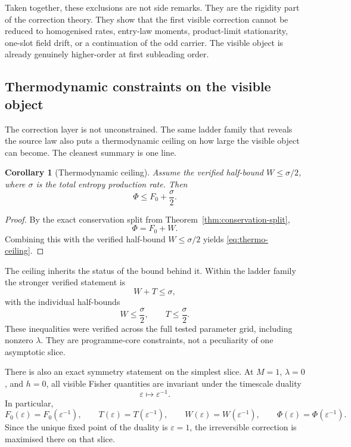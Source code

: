 \documentclass[11pt]{article}
\numberwithin{equation}{section}
\newcommand{\eps}{\varepsilon}
\theoremstyle{thmcompact}
\newtheorem{corollary}[theorem]{Corollary}
\theoremstyle{remark}
\begin{document}
Taken together, these exclusions are not side remarks. They are the rigidity part of the correction theory. They show that the first visible correction cannot be reduced to homogenised rates, entry-law moments, product-limit stationarity, one-slot field drift, or a continuation of the odd carrier. The visible object is already genuinely higher-order at first subleading order.

\subsection{Thermodynamic constraints on the visible object}

The correction layer is not unconstrained. The same ladder family that reveals the source law also puts a thermodynamic ceiling on how large the visible object can become. The cleanest summary is one line.

\begin{corollary}[Thermodynamic ceiling]\label{cor:thermodynamic-ceiling}
Assume the verified half-bound $W\le \sigma/2$, where $\sigma$ is the total entropy production rate. Then
\begin{equation}\label{eq:thermo-ceiling}
\Phi\le F_0+\frac{\sigma}{2}.
\end{equation}
\end{corollary}

\begin{proof}
By the exact conservation split from Theorem~\ref{thm:conservation-split},
\[
\Phi=F_0+W.
\]
Combining this with the verified half-bound $W\le \sigma/2$ yields \eqref{eq:thermo-ceiling}.
\end{proof}

The ceiling inherits the status of the bound behind it. Within the ladder family the stronger verified statement is
\begin{equation}\label{eq:epr-fisher-sum}
W+T\le \sigma,
\end{equation}
with the individual half-bounds
\begin{equation}\label{eq:epr-fisher-half}
W\le \frac{\sigma}{2},
\qquad
T\le \frac{\sigma}{2}.
\end{equation}
These inequalities were verified across the full tested parameter grid, including nonzero $\lambda$. They are programme-core constraints, not a peculiarity of one asymptotic slice.

There is also an exact symmetry statement on the simplest slice. At $M=1$, $\lambda=0$, and $h=0$, all visible Fisher quantities are invariant under the timescale duality
\begin{equation}\label{eq:eps-duality}
\eps\longmapsto \eps^{-1}.
\end{equation}
In particular,
\begin{equation}\label{eq:eps-duality-components}
F_0(\eps)=F_0(\eps^{-1}),
\qquad
T(\eps)=T(\eps^{-1}),
\qquad
W(\eps)=W(\eps^{-1}),
\qquad
\Phi(\eps)=\Phi(\eps^{-1}).
\end{equation}
Since the unique fixed point of the duality is $\eps=1$, the irreversible correction is maximised there on that slice.
\end{document}
